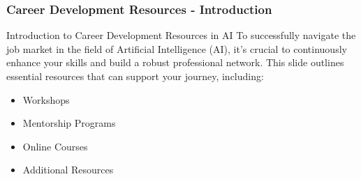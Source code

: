 \documentclass{beamer}
\begin{document}
\begin{frame}[fragile]
    \frametitle{Career Development Resources - Introduction}
    \begin{block}{Introduction to Career Development Resources in AI}
        To successfully navigate the job market in the field of Artificial Intelligence (AI), it's crucial to continuously enhance your skills and build a robust professional network. This slide outlines essential resources that can support your journey, including:
    \end{block}
    \begin{itemize}
        \item Workshops
        \item Mentorship Programs
        \item Online Courses
        \item Additional Resources
    \end{itemize}
\end{frame}
\end{document}
